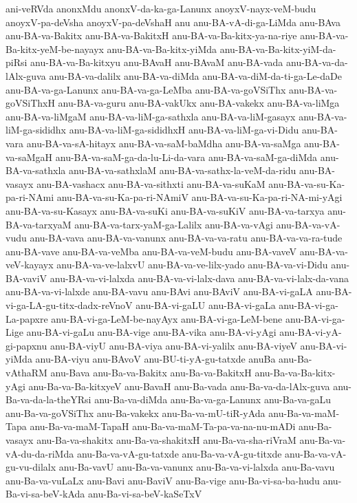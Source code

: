 {ani-veRVda
anonxMdu
anonxV-da-ka-ga-Lanunx
anoyxV-nayx-veM-budu
anoyxV-pa-deVsha
anoyxV-pa-deVshaH
anu
anu-BA-vA-di-ga-LiMda
anu-BAva
anu-BA-va-Bakitx
anu-BA-va-BakitxH
anu-BA-va-Ba-kitx-ya-na-riye
anu-BA-va-Ba-kitx-yeM-be-nayayx
anu-BA-va-Ba-kitx-yiMda
anu-BA-va-Ba-kitx-yiM-da-piRsi
anu-BA-va-Ba-kitxyu
anu-BAvaH
anu-BAvaM
anu-BA-vada
anu-BA-va-da-lAlx-guva
anu-BA-va-dalilx
anu-BA-va-diMda
anu-BA-va-diM-da-ti-ga-Le-daDe
anu-BA-va-ga-Lanunx
anu-BA-va-ga-LeMba
anu-BA-va-goVSiThx
anu-BA-va-goVSiThxH
anu-BA-va-guru
anu-BA-vakUkx
anu-BA-vakekx
anu-BA-va-liMga
anu-BA-va-liMgaM
anu-BA-va-liM-ga-sathxla
anu-BA-va-liM-gasayx
anu-BA-va-liM-ga-sididhx
anu-BA-va-liM-ga-sididhxH
anu-BA-va-liM-ga-vi-Didu
anu-BA-vara
anu-BA-va-sA-hitayx
anu-BA-va-saM-baMdha
anu-BA-va-saMga
anu-BA-va-saMgaH
anu-BA-va-saM-ga-da-lu-Li-da-vara
anu-BA-va-saM-ga-diMda
anu-BA-va-sathxla
anu-BA-va-sathxlaM
anu-BA-va-sathx-la-veM-da-ridu
anu-BA-vasayx
anu-BA-vashacx
anu-BA-va-sithxti
anu-BA-va-suKaM
anu-BA-va-su-Ka-pa-ri-NAmi
anu-BA-va-su-Ka-pa-ri-NAmiV
anu-BA-va-su-Ka-pa-ri-NA-mi-yAgi
anu-BA-va-su-Kasayx
anu-BA-va-suKi
anu-BA-va-suKiV
anu-BA-va-tarxya
anu-BA-va-tarxyaM
anu-BA-va-tarx-yaM-ga-Lalilx
anu-BA-va-vAgi
anu-BA-va-vA-vudu
anu-BA-vava
anu-BA-va-vanunx
anu-BA-va-va-ratu
anu-BA-va-va-ra-tude
anu-BA-vave
anu-BA-va-veMba
anu-BA-va-veM-budu
anu-BA-vaveV
anu-BA-va-veV-kayayx
anu-BA-va-ve-lalxvU
anu-BA-va-ve-lilx-yado
anu-BA-va-vi-Didu
anu-BA-vaviV
anu-BA-va-vi-lalxda
anu-BA-va-vi-lalx-dava
anu-BA-va-vi-lalx-da-vana
anu-BA-va-vi-lalxde
anu-BA-vavu
anu-BAvi
anu-BAviV
anu-BA-vi-gaLA
anu-BA-vi-ga-LA-gu-titx-dadx-reVnoV
anu-BA-vi-gaLU
anu-BA-vi-gaLa
anu-BA-vi-ga-La-papxre
anu-BA-vi-ga-LeM-be-nayAyx
anu-BA-vi-ga-LeM-bene
anu-BA-vi-ga-Lige
anu-BA-vi-gaLu
anu-BA-vige
anu-BA-vika
anu-BA-vi-yAgi
anu-BA-vi-yA-gi-papxnu
anu-BA-viyU
anu-BA-viya
anu-BA-vi-yalilx
anu-BA-viyeV
anu-BA-vi-yiMda
anu-BA-viyu
anu-BAvoV
anu-BU-ti-yA-gu-tatxde
anuBa
anu-Ba-vAthaRM
anu-Bava
anu-Ba-va-Bakitx
anu-Ba-va-BakitxH
anu-Ba-va-Ba-kitx-yAgi
anu-Ba-va-Ba-kitxyeV
anu-BavaH
anu-Ba-vada
anu-Ba-va-da-lAlx-guva
anu-Ba-va-da-la-theYRsi
anu-Ba-va-diMda
anu-Ba-va-ga-Lanunx
anu-Ba-va-gaLu
anu-Ba-va-goVSiThx
anu-Ba-vakekx
anu-Ba-va-mU-tiR-yAda
anu-Ba-va-maM-Tapa
anu-Ba-va-maM-TapaH
anu-Ba-va-maM-Ta-pa-va-na-nu-mADi
anu-Ba-vasayx
anu-Ba-va-shakitx
anu-Ba-va-shakitxH
anu-Ba-va-sha-riVraM
anu-Ba-va-vA-du-da-riMda
anu-Ba-va-vA-gu-tatxde
anu-Ba-va-vA-gu-titxde
anu-Ba-va-vA-gu-vu-dilalx
anu-Ba-vavU
anu-Ba-va-vanunx
anu-Ba-va-vi-lalxda
anu-Ba-vavu
anu-Ba-va-vuLaLx
anu-Bavi
anu-BaviV
anu-Ba-vige
anu-Ba-vi-sa-ba-hudu
anu-Ba-vi-sa-beV-kAda
anu-Ba-vi-sa-beV-kaSeTxV
}

